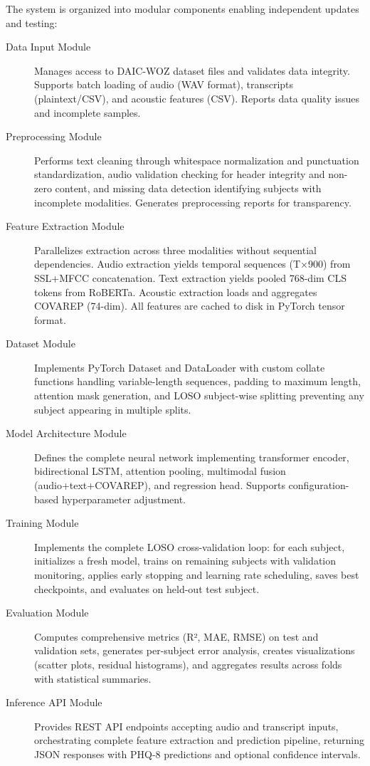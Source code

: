 \documentclass[12pt]{article}
\begin{document}
	The system is organized into modular components enabling independent updates and testing:

	\begin{description}
		\item[Data Input Module] Manages access to DAIC-WOZ dataset files and validates data integrity. Supports batch loading of audio (WAV format), transcripts (plaintext/CSV), and acoustic features (CSV). Reports data quality issues and incomplete samples.

		\item[Preprocessing Module] Performs text cleaning through whitespace normalization and punctuation standardization, audio validation checking for header integrity and non-zero content, and missing data detection identifying subjects with incomplete modalities. Generates preprocessing reports for transparency.

		\item[Feature Extraction Module] Parallelizes extraction across three modalities without sequential dependencies. Audio extraction yields temporal sequences (T×900) from SSL+MFCC concatenation. Text extraction yields pooled 768-dim CLS tokens from RoBERTa. Acoustic extraction loads and aggregates COVAREP (74-dim). All features are cached to disk in PyTorch tensor format.

		\item[Dataset Module] Implements PyTorch Dataset and DataLoader with custom collate functions handling variable-length sequences, padding to maximum length, attention mask generation, and LOSO subject-wise splitting preventing any subject appearing in multiple splits.

		\item[Model Architecture Module] Defines the complete neural network implementing transformer encoder, bidirectional LSTM, attention pooling, multimodal fusion (audio+text+COVAREP), and regression head. Supports configuration-based hyperparameter adjustment.

		\item[Training Module] Implements the complete LOSO cross-validation loop: for each subject, initializes a fresh model, trains on remaining subjects with validation monitoring, applies early stopping and learning rate scheduling, saves best checkpoints, and evaluates on held-out test subject.

		\item[Evaluation Module] Computes comprehensive metrics (R², MAE, RMSE) on test and validation sets, generates per-subject error analysis, creates visualizations (scatter plots, residual histograms), and aggregates results across folds with statistical summaries.

		\item[Inference API Module] Provides REST API endpoints accepting audio and transcript inputs, orchestrating complete feature extraction and prediction pipeline, returning JSON responses with PHQ-8 predictions and optional confidence intervals.
	\end{description}
\end{document}
